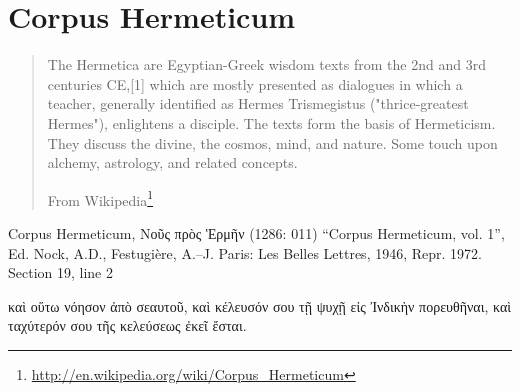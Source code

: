 \documentclass[12pt,letterpaper,twoside,final]{memoir}
\begin{document}
\section{Corpus Hermeticum}
\blockquote[From Wikipedia\footnote{\url{http://en.wikipedia.org/wiki/Corpus_Hermeticum}}]{The Hermetica are Egyptian-Greek wisdom texts from the 2nd and 3rd centuries CE,[1] which are mostly presented as dialogues in which a teacher, generally identified as Hermes Trismegistus ("thrice-greatest Hermes"), enlightens a disciple. The texts form the basis of Hermeticism. They discuss the divine, the cosmos, mind, and nature. Some touch upon alchemy, astrology, and related concepts.}
\begin{greek}

Corpus Hermeticum, Νοῦς πρὸς Ἑρμῆν (1286: 011)
“Corpus Hermeticum, vol. 1”, Ed. Nock, A.D., Festugière, A.–J.
Paris: Les Belles Lettres, 1946, Repr. 1972.
Section 19, line 2

καὶ οὕτω νόησον ἀπὸ σεαυτοῦ, καὶ κέλευσόν σου τῇ 
ψυχῇ εἰς Ἰνδικὴν πορευθῆναι, καὶ ταχύτερόν σου τῆς 
κελεύσεως ἐκεῖ ἔσται. 

\end{greek}
\end{document}
